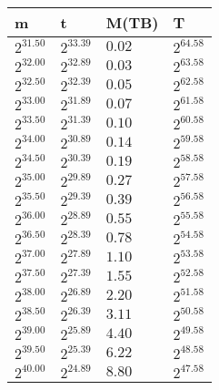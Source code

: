 \begin{tabular}{llll}
m & t & M(TB) & T \\ \hline
$2^{31.50}$ & $2^{33.39}$ & $0.02$ & $2^{64.58}$ \\
$2^{32.00}$ & $2^{32.89}$ & $0.03$ & $2^{63.58}$ \\
$2^{32.50}$ & $2^{32.39}$ & $0.05$ & $2^{62.58}$ \\
$2^{33.00}$ & $2^{31.89}$ & $0.07$ & $2^{61.58}$ \\
$2^{33.50}$ & $2^{31.39}$ & $0.10$ & $2^{60.58}$ \\
$2^{34.00}$ & $2^{30.89}$ & $0.14$ & $2^{59.58}$ \\
$2^{34.50}$ & $2^{30.39}$ & $0.19$ & $2^{58.58}$ \\
$2^{35.00}$ & $2^{29.89}$ & $0.27$ & $2^{57.58}$ \\
$2^{35.50}$ & $2^{29.39}$ & $0.39$ & $2^{56.58}$ \\
$2^{36.00}$ & $2^{28.89}$ & $0.55$ & $2^{55.58}$ \\
$2^{36.50}$ & $2^{28.39}$ & $0.78$ & $2^{54.58}$ \\
$2^{37.00}$ & $2^{27.89}$ & $1.10$ & $2^{53.58}$ \\
$2^{37.50}$ & $2^{27.39}$ & $1.55$ & $2^{52.58}$ \\
$2^{38.00}$ & $2^{26.89}$ & $2.20$ & $2^{51.58}$ \\
$2^{38.50}$ & $2^{26.39}$ & $3.11$ & $2^{50.58}$ \\
$2^{39.00}$ & $2^{25.89}$ & $4.40$ & $2^{49.58}$ \\
$2^{39.50}$ & $2^{25.39}$ & $6.22$ & $2^{48.58}$ \\
$2^{40.00}$ & $2^{24.89}$ & $8.80$ & $2^{47.58}$ \\
\end{tabular}
 \ 
